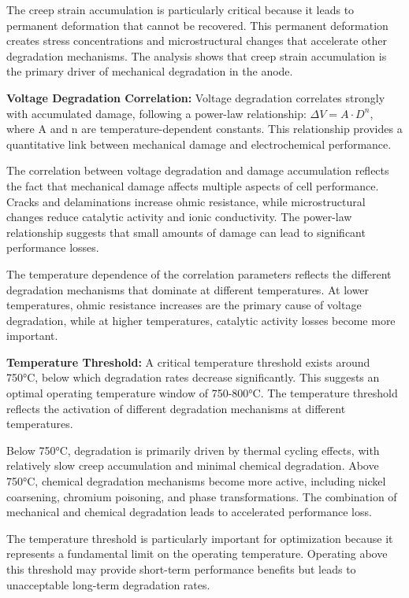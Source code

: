 \documentclass[conference]{IEEEtran}
\begin{document}
The creep strain accumulation is particularly critical because it leads to permanent deformation that cannot be recovered. This permanent deformation creates stress concentrations and microstructural changes that accelerate other degradation mechanisms. The analysis shows that creep strain accumulation is the primary driver of mechanical degradation in the anode.

\textbf{Voltage Degradation Correlation:} Voltage degradation correlates strongly with accumulated damage, following a power-law relationship: $\Delta V = A \cdot D^n$, where A and n are temperature-dependent constants. This relationship provides a quantitative link between mechanical damage and electrochemical performance.

The correlation between voltage degradation and damage accumulation reflects the fact that mechanical damage affects multiple aspects of cell performance. Cracks and delaminations increase ohmic resistance, while microstructural changes reduce catalytic activity and ionic conductivity. The power-law relationship suggests that small amounts of damage can lead to significant performance losses.

The temperature dependence of the correlation parameters reflects the different degradation mechanisms that dominate at different temperatures. At lower temperatures, ohmic resistance increases are the primary cause of voltage degradation, while at higher temperatures, catalytic activity losses become more important.

\textbf{Temperature Threshold:} A critical temperature threshold exists around 750°C, below which degradation rates decrease significantly. This suggests an optimal operating temperature window of 750-800°C. The temperature threshold reflects the activation of different degradation mechanisms at different temperatures.

Below 750°C, degradation is primarily driven by thermal cycling effects, with relatively slow creep accumulation and minimal chemical degradation. Above 750°C, chemical degradation mechanisms become more active, including nickel coarsening, chromium poisoning, and phase transformations. The combination of mechanical and chemical degradation leads to accelerated performance loss.

The temperature threshold is particularly important for optimization because it represents a fundamental limit on the operating temperature. Operating above this threshold may provide short-term performance benefits but leads to unacceptable long-term degradation rates.
\end{document}
